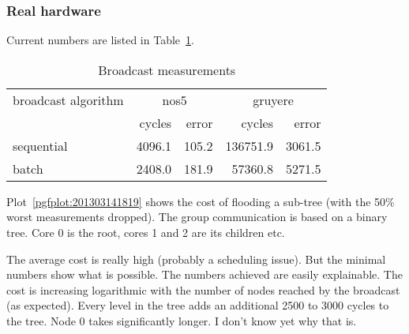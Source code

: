 \documentclass{article}
\begin{document}
\subsubsection{Real hardware}

Current numbers are listed in Table~\ref{tab:bc_measurements}.

\begin{table}[htb]
  \centering
  \begin{tabular}{lrrrr}
    \toprule
    broadcast algorithm & \multicolumn{2}{c}{nos5} & \multicolumn{2}{c}{gruyere} \\
      & cycles & error & cycles & error \\
    \midrule
    sequential &  4096.1 &  105.2 & 136751.9 &   3061.5 \\
    batch      &  2408.0 &  181.9 &  57360.8 &   5271.5 \\
    \bottomrule
  \end{tabular}
  \caption{Broadcast measurements}
  \label{tab:bc_measurements}
\end{table}

Plot~\ref{pgfplot:201303141819} shows the cost of flooding a sub-tree
(with the 50\% worst measurements dropped). The group communication is
based on a binary tree. Core 0 is the root, cores 1 and 2 are its
children etc.

The average cost is really high (probably a scheduling issue). But the
minimal numbers show what is possible. The numbers achieved are easily
explainable. The cost is increasing logarithmic with the number of
nodes reached by the broadcast (as expected). Every level in the tree
adds an additional 2500 to 3000 cycles to the tree. Node 0 takes
significantly longer. I don't know yet why that is.
\end{document}
